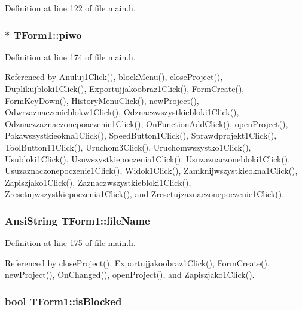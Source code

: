 Definition at line 122 of file main.h.\hypertarget{classTForm1_b49ba3dff8624f56cb0374f140e6479d}{
\subsubsection[piwo]{$\ast$ {\bf TForm1::piwo}}}
\label{classTForm1_b49ba3dff8624f56cb0374f140e6479d}




Definition at line 174 of file main.h.

Referenced by Anuluj1Click(), blockMenu(), closeProject(), Duplikujbloki1Click(), Exportujjakoobraz1Click(), FormCreate(), FormKeyDown(), HistoryMenuClick(), newProject(), Odwrzaznaczenieblokw1Click(), Odznaczwszystkiebloki1Click(), Odznaczzaznaczonepoaczenie1Click(), OnFunctionAddClick(), openProject(), Pokawszystkieokna1Click(), SpeedButton1Click(), Sprawdprojekt1Click(), ToolButton11Click(), Uruchom3Click(), Uruchomwszystko1Click(), Usubloki1Click(), Usuwszystkiepoczenia1Click(), Usuzaznaczonebloki1Click(), Usuzaznaczonepoczenie1Click(), Widok1Click(), Zamknijwszystkieokna1Click(), Zapiszjako1Click(), Zaznaczwszystkiebloki1Click(), Zresetujwszystkiepoczenia1Click(), and Zresetujzaznaczonepoczenie1Click().\hypertarget{classTForm1_654ca370064b6939024e2b18eab9d582}{
\subsubsection[fileName]{\setlength{\rightskip}{0pt plus 5cm}AnsiString {\bf TForm1::fileName}}}
\label{classTForm1_654ca370064b6939024e2b18eab9d582}




Definition at line 175 of file main.h.

Referenced by closeProject(), Exportujjakoobraz1Click(), FormCreate(), newProject(), OnChanged(), openProject(), and Zapiszjako1Click().\hypertarget{classTForm1_308a6fe8b59a83de7a6a1dfbc49be29e}{
\subsubsection[isBlocked]{\setlength{\rightskip}{0pt plus 5cm}bool {\bf TForm1::isBlocked}}}
\label{classTForm1_308a6fe8b59a83de7a6a1dfbc49be29e}




